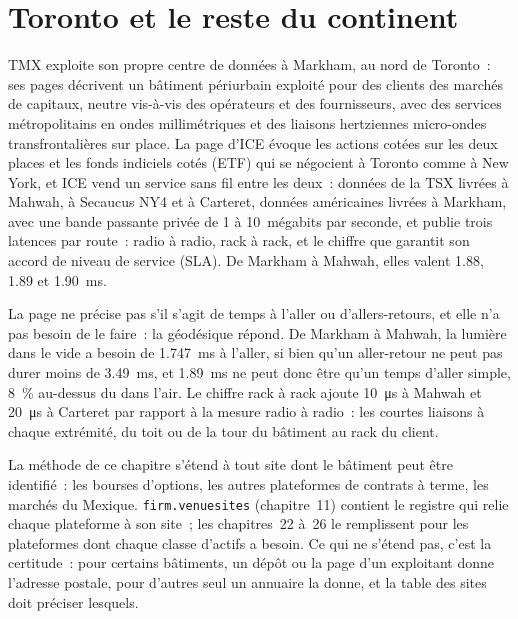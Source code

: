 \section{Toronto et le reste du continent}

TMX exploite son propre centre de données à Markham, au nord de Toronto~: ses pages décrivent un bâtiment périurbain exploité pour des clients des marchés de capitaux,
neutre vis-à-vis des opérateurs et des fournisseurs, avec des services métropolitains en ondes millimétriques et des liaisons hertziennes micro-ondes transfrontalières sur place. La page d'ICE évoque les actions cotées sur les deux places
et les fonds indiciels cotés (ETF) qui se négocient à Toronto comme à New York, et ICE vend un service sans fil entre les deux~: données de la TSX livrées à Mahwah, à Secaucus NY4 et à Carteret, données américaines livrées à Markham, avec une bande passante privée de 1 à
10~mégabits par seconde, et publie trois latences par route~: radio à radio, rack à rack, et le chiffre que garantit son accord de
niveau de service (SLA). De Markham à Mahwah, elles valent 1.88, 1.89 et \qty{1.90}{\milli\second}.

La page ne précise pas s'il s'agit de temps à l'aller ou d'allers-retours, et elle n'a pas besoin de le faire~: la géodésique répond. De Markham à Mahwah, la lumière dans
le vide a besoin de \qty{1.747}{\milli\second} à l'aller, si bien qu'un aller-retour ne peut pas durer moins de \qty{3.49}{\milli\second}, et \qty{1.89}{\milli\second}
ne peut donc être qu'un temps d'aller simple, 8~\% au-dessus du  dans l'air. Le chiffre rack à rack ajoute \qty{10}{\micro\second} à Mahwah et \qty{20}{\micro\second} à
Carteret par rapport à la mesure radio à radio~: les courtes liaisons à chaque extrémité, du toit ou de la tour du bâtiment au rack du client.

\begin{remark}\label{rem:nw:the-north-american-map:rest}
La méthode de ce chapitre s'étend à tout site dont le bâtiment peut être identifié~: les bourses d'options, les autres plateformes de contrats à terme, les marchés
du Mexique. \texttt{firm.venuesites} (chapitre~11) contient le registre qui relie chaque plateforme à son site~; les chapitres~22 à~26 le remplissent pour les plateformes
dont chaque classe d'actifs a besoin. Ce qui ne s'étend pas, c'est la certitude~: pour certains bâtiments, un dépôt ou la page d'un exploitant donne l'adresse postale, pour
d'autres seul un annuaire la donne, et la table des sites doit préciser lesquels.
\end{remark}

